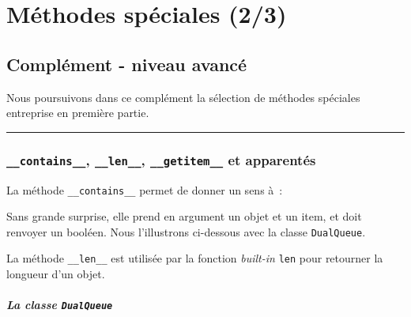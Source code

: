     
    
    
    

    

    \hypertarget{muxe9thodes-spuxe9ciales-23}{%
\section{Méthodes spéciales (2/3)}\label{muxe9thodes-spuxe9ciales-23}}

    \hypertarget{compluxe9ment---niveau-avancuxe9}{%
\subsection{Complément - niveau
avancé}\label{compluxe9ment---niveau-avancuxe9}}

    Nous poursuivons dans ce complément la sélection de méthodes spéciales
entreprise en première partie.

    \begin{center}\rule{0.5\linewidth}{\linethickness}\end{center}

    \hypertarget{contains__-__len__-__getitem__-et-apparentuxe9s}{%
\subsubsection{\texorpdfstring{\texttt{\_\_contains\_\_},
\texttt{\_\_len\_\_}, \texttt{\_\_getitem\_\_} et
apparentés}{\_\_contains\_\_, \_\_len\_\_, \_\_getitem\_\_ et apparentés}}\label{contains__-__len__-__getitem__-et-apparentuxe9s}}

    La méthode \texttt{\_\_contains\_\_} permet de donner un sens à~:

\begin{Shaded}
\begin{Highlighting}[frame=lines,framerule=0.6mm,rulecolor=\color{asisframecolor}]
\end{Highlighting}
\end{Shaded}

Sans grande surprise, elle prend en argument un objet et un item, et
doit renvoyer un booléen. Nous l'illustrons ci-dessous avec la classe
\texttt{DualQueue}.

    La méthode \texttt{\_\_len\_\_} est utilisée par la fonction
\emph{built-in} \texttt{len} pour retourner la longueur d'un objet.

    \hypertarget{la-classe-dualqueue}{%
\subparagraph{\texorpdfstring{La classe
\texttt{DualQueue}}{La classe DualQueue}}\label{la-classe-dualqueue}}


